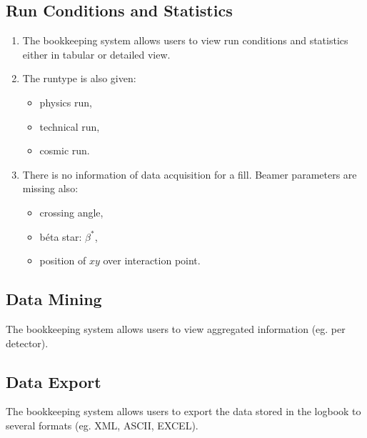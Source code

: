 \subsection{Run Conditions and Statistics}
\begin{enumerate}
  \item The bookkeeping system allows users to view run conditions and statistics either in tabular or detailed view.
  \item The runtype is also given:
  \begin{itemize}
    \item physics run,
    \item technical run,
    \item cosmic run.
  \end{itemize}
  \item There is no information of data acquisition for a fill. Beamer parameters are missing also:
  \begin{itemize}
    \item crossing angle,
    \item b\'eta star: $\beta^*$,
    \item position of $xy$ over interaction point.
  \end{itemize}
\end{enumerate}
\subsection{Data Mining}
The bookkeeping system allows users to view aggregated information (eg. per detector).
\subsection{Data Export}
The bookkeeping system allows users to export the data stored in the logbook to several formats (eg. XML, ASCII, EXCEL).
